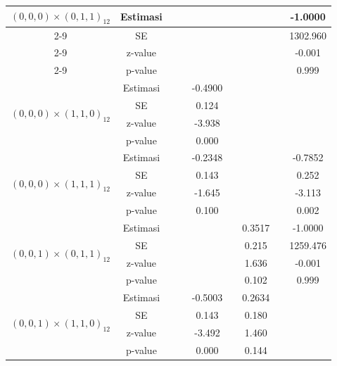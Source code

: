 \begin{enumerate}[label=\alph*.]
\begin{longtable}{|c|c|c|c|c|c|c|c|c|}
            \multirow{2}{*}{$(0,0,0)\times(0,1,1)_{12}$}
            & Estimasi & {} & {} & {} & {} & {} & {} & -1.0000 \\ \cline{2-9}
            & SE       & {} & {} & {} & {} & {} & {} & 1302.960\\ \cline{2-9}
            & z-value  &  {}   & {} & {} & {} & {} & {} & -0.001 \\ \cline{2-9}
            & p-value  & {} & {} & {} & {} & {} & {} & 0.999 \\ \hline

            \multirow{4}{*}{$(0,0,0)\times(1,1,0)_{12}$}
            & Estimasi & {} & {} & -0.4900 & {} & {} & {} & {} \\ \cline{2-9}
            & SE       & {} & {} & 0.124 & {} & {} & {} & {}\\ \cline{2-9}
            & z-value  & {} & {} & -3.938 & {} & {} & {} & {}\\ \cline{2-9}
            & p-value  & {} & {} & 0.000 & {} & {} & {} & {}\\ \hline

            \multirow{4}{*}{$(0,0,0)\times(1,1,1)_{12}$}
            & Estimasi & {} & {} & -0.2348 & {} & {} & {} & -0.7852\\ \cline{2-9}
            & SE       & {} & {} & 0.143 & {} & {} & {} & 0.252\\ \cline{2-9}
            & z-value  & {} & {} & -1.645 & {}   & {}   & {} & -3.113\\ \cline{2-9}
            & p-value  & {} & {} & 0.100 & {} & {} & {} & 0.002\\ \hline

            \multirow{4}{*}{$(0,0,1)\times(0,1,1)_{12}$}
            & Estimasi & {} & {} & {} & {} & 0.3517 & {} & -1.0000 \\ \cline{2-9}
            & SE       & {} & {} & {} & {} & 0.215 & {} & 1259.476\\ \cline{2-9}
            & z-value  & {} & {} & {} & {} & 1.636 & {} & -0.001\\ \cline{2-9}
            & p-value  & {} & {} & {} & {} & 0.102 & {} & 0.999\\ \hline

            \multirow{4}{*}{$(0,0,1)\times(1,1,0)_{12}$}
            & Estimasi & {} & {} & -0.5003 & {}  & 0.2634 & {} & {}\\ \cline{2-9}
            & SE       & {} & {} & 0.143 & {} & 0.180 & {} & {}\\ \cline{2-9}
            & z-value  & {} & {} & -3.492 & {} & 1.460 & {} & {}\\ \cline{2-9}
            & p-value  & {} & {} & 0.000 & {} & 0.144 & {} & {} \\ \hline


\end{longtable}
\end{enumerate}
